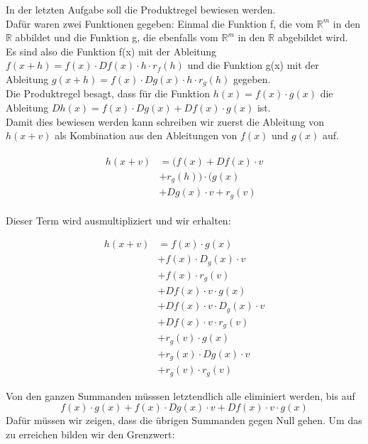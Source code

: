 \documentclass{article}
\begin{document}
\begin{multicols}{2}
In der letzten Aufgabe soll die Produktregel bewiesen werden. \\
Dafür waren zwei Funktionen gegeben: Einmal die Funktion f, die vom $\mathds{R}^m$ in den $\mathds{R}$ abbildet und die Funktion g, die ebenfalls vom $\mathds{R}^m$ in den $\mathds{R}$ abgebildet wird. \\
Es sind also die Funktion f(x) mit der Ableitung $f(x+h) = f(x) \cdot Df(x) \cdot h \cdot r_{f}(h)$ und die Funktion g(x) mit der Ableitung $g(x+h) = f(x) \cdot Dg(x) \cdot h \cdot r_{g}(h)$ gegeben. \\
Die Produktregel besagt, dass für die Funktion $h(x) = f(x) \cdot g(x)$ die Ableitung $Dh(x) = f(x) \cdot Dg(x) + Df(x) \cdot g(x)$ %
 ist. \\
Damit dies bewiesen werden kann schreiben wir zuerst die Ableitung von $h(x+v)$ als Kombination aus den Ableitungen von $f(x)$ und $g(x)$ auf.

\begin{align} \begin{split} h(x+v) & = (f(x) + Df(x) \cdot v \\ & + r_{g}(h)) \cdot (g(x) \\ & + Dg(x) \cdot v + r_{g}(v) \end{split} \end{align}

Dieser Term wird ausmultipliziert und wir erhalten: 

\begin{equation}
\begin{split} h(x+v) & = f(x) \cdot g(x) \\ & + f(x)  \cdot D_{g}(x) \cdot v \\ & + f(x) \cdot r_{g}(v) \\ & + Df(x) \cdot v \cdot g(x) \\ & +  Df(x) \cdot v \cdot D_{g}(x) \cdot v  \\ & + Df(x) \cdot v \cdot r_{g}(v) \\ & +  r_{g}(v) \cdot g(x) \\ & + r_{g}(x) \cdot Dg(x) \cdot v \\ & + r_{g}(v) \cdot r_{g}(v) \end{split} \end{equation}   %

Von den ganzen Summanden müsssen letztendlich alle eliminiert werden, bis auf 
\begin{equation} f(x) \cdot g(x) + f(x) \cdot Dg(x) \cdot v + Df(x) \cdot v \cdot g(x) \end{equation} 
Dafür müssen wir zeigen, dass die übrigen Summanden gegen Null gehen. Um das zu erreichen bilden wir den Grenzwert:


\end{multicols}
\end{document}

